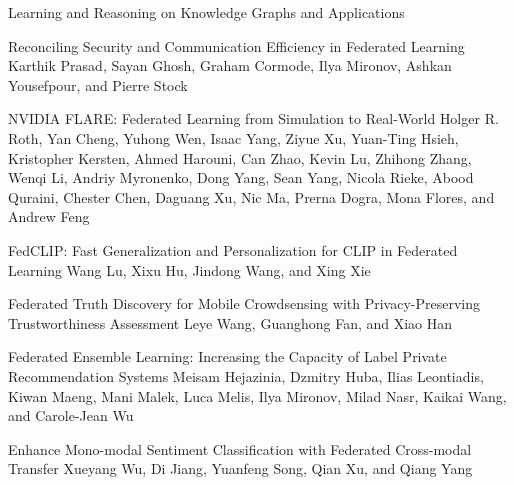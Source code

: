 \documentclass[11pt]{article}
\begin{document}
\begin{bulletin}
\begin{articlesection}{Learning and Reasoning on Knowledge Graphs and Applications}

% 


\begin{article}
{Reconciling Security and Communication Efficiency in Federated Learning}
{Karthik Prasad, Sayan Ghosh, Graham Cormode, Ilya Mironov, Ashkan Yousefpour, and Pierre Stock}

\end{article}

\begin{article}
{NVIDIA FLARE: Federated Learning from Simulation to Real-World}
{Holger R. Roth,
Yan Cheng,
Yuhong Wen,
Isaac Yang,
Ziyue Xu,
Yuan-Ting Hsieh,
Kristopher Kersten,
Ahmed Harouni,
Can Zhao,
Kevin Lu,
Zhihong Zhang,
Wenqi Li,
Andriy Myronenko,
Dong Yang,
Sean Yang,
Nicola Rieke,
Abood Quraini,
Chester Chen,
Daguang Xu,
Nic Ma,
Prerna Dogra,
Mona Flores, and
Andrew Feng}

\end{article}


\begin{article}
{FedCLIP: Fast Generalization and Personalization for CLIP in Federated Learning}
{Wang Lu, Xixu Hu, Jindong Wang, and Xing Xie}

\end{article}


\begin{article}
{Federated Truth Discovery for Mobile Crowdsensing with Privacy-Preserving Trustworthiness Assessment}
{Leye Wang, Guanghong Fan, and Xiao Han}

\end{article}

\begin{article}
{Federated Ensemble Learning: Increasing the Capacity of Label Private Recommendation Systems}
{Meisam Hejazinia, Dzmitry Huba, Ilias Leontiadis, Kiwan Maeng, Mani Malek, Luca Melis, Ilya Mironov, Milad Nasr, Kaikai Wang, and Carole-Jean Wu}

\end{article}

\begin{article}
{Enhance Mono-modal Sentiment Classification with Federated Cross-modal Transfer}
{Xueyang Wu, Di Jiang, Yuanfeng Song, Qian Xu, and Qiang Yang}

\end{article}


\end{articlesection}
\end{bulletin}
\end{document}
